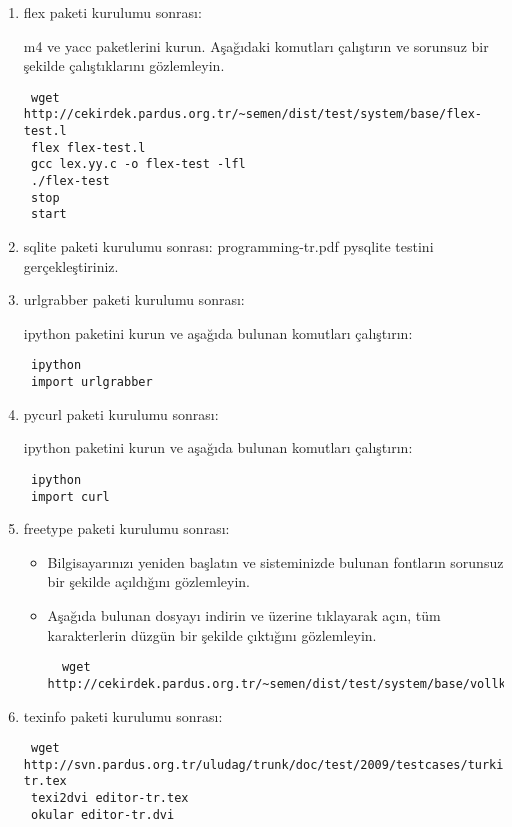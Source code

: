 \documentclass[a4paper,10pt]{article}
\begin{document}
\begin{enumerate}
\item flex paketi kurulumu sonrası:

m4 ve yacc paketlerini kurun.
Aşağıdaki komutları çalıştırın ve sorunsuz bir şekilde çalıştıklarını gözlemleyin.
\begin{verbatim}
 wget http://cekirdek.pardus.org.tr/~semen/dist/test/system/base/flex-test.l
 flex flex-test.l
 gcc lex.yy.c -o flex-test -lfl 
 ./flex-test
 stop
 start
\end{verbatim}


\item sqlite paketi kurulumu sonrası:
programming-tr.pdf pysqlite testini gerçekleştiriniz.

\item urlgrabber paketi kurulumu sonrası:

ipython paketini kurun ve aşağıda bulunan komutları çalıştırın:
\begin{verbatim}
 ipython
 import urlgrabber
\end{verbatim}

\item pycurl paketi kurulumu sonrası:

ipython paketini kurun ve aşağıda bulunan komutları çalıştırın:
\begin{verbatim}
 ipython
 import curl
\end{verbatim}

\item freetype paketi kurulumu sonrası: 

\begin{itemize}
 \item Bilgisayarınızı yeniden başlatın ve sisteminizde bulunan fontların sorunsuz bir şekilde açıldığını gözlemleyin.
 \item Aşağıda bulunan dosyayı indirin ve üzerine tıklayarak açın, tüm karakterlerin düzgün bir şekilde çıktığını gözlemleyin.

  \begin{verbatim}
  wget http://cekirdek.pardus.org.tr/~semen/dist/test/system/base/vollkorn.otf
  \end{verbatim}
\end{itemize}


\item texinfo paketi kurulumu sonrası:
\begin{verbatim}
 wget http://svn.pardus.org.tr/uludag/trunk/doc/test/2009/testcases/turkish/editor-tr.tex
 texi2dvi editor-tr.tex
 okular editor-tr.dvi
\end{verbatim}



\end{enumerate}
\end{document}
